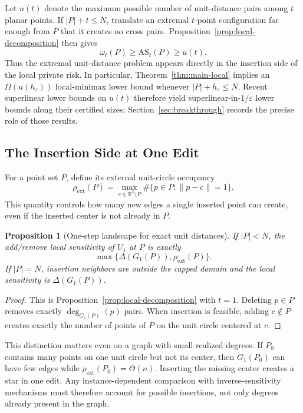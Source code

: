 \documentclass[11pt]{article}
\newtheorem{proposition}[theorem]{Proposition}
\newcommand{\R}{\mathbb{R}}
\newcommand{\eps}{\varepsilon}
\begin{document}
Let \(u(t)\) denote the maximum possible number of unit-distance pairs among \(t\) planar points. If \(|P|+t\le N\), translate an extremal \(t\)-point configuration far enough from \(P\) that it creates no cross pairs. Proposition~\ref{prop:local-decomposition} then gives
\[
\omega_t(P)\ge \mathrm{AS}_t(P)\ge u(t).
\]
Thus the extremal unit-distance problem appears directly in the insertion side of the local private risk. In particular, Theorem~\ref{thm:main-local} implies an \(\Omega(u(h_\eps))\) local-minimax lower bound whenever \(|P|+h_\eps\le N\). Recent superlinear lower bounds on \(u(t)\) therefore yield superlinear-in-\(1/\eps\) lower bounds along their certified sizes; Section~\ref{sec:breakthrough} records the precise role of those results.

\subsection{The Insertion Side at One Edit}

For a point set \(P\), define its external unit-circle occupancy
\[
\rho_{\mathrm{ext}}(P)=\max_{c\in\R^2\setminus P}\#\{p\in P:\|p-c\|=1\}.
\]
This quantity controls how many new edges a single inserted point can create, even if the inserted center is not already in \(P\).

\begin{proposition}[One-step landscape for exact unit distances]
\label{prop:local-landscape}
If \(|P|<N\), the add/remove local sensitivity of \(U_1\) at \(P\) is exactly
\[
\max\{\Delta(G_1(P)),\rho_{\mathrm{ext}}(P)\}.
\]
If \(|P|=N\), insertion neighbors are outside the capped domain and the local sensitivity is \(\Delta(G_1(P))\).
\end{proposition}

\begin{proof}
This is Proposition~\ref{prop:local-decomposition} with \(t=1\). Deleting \(p\in P\) removes exactly \(\deg_{G_1(P)}(p)\) pairs. When insertion is feasible, adding \(c\notin P\) creates exactly the number of points of \(P\) on the unit circle centered at \(c\).
\end{proof}

This distinction matters even on a graph with small realized degrees. If \(P_0\) contains many points on one unit circle but not its center, then \(G_1(P_0)\) can have few edges while \(\rho_{\mathrm{ext}}(P_0)=\Theta(n)\). Inserting the missing center creates a star in one edit. Any instance-dependent comparison with inverse-sensitivity mechanisms must therefore account for possible insertions, not only degrees already present in the graph.
\end{document}
